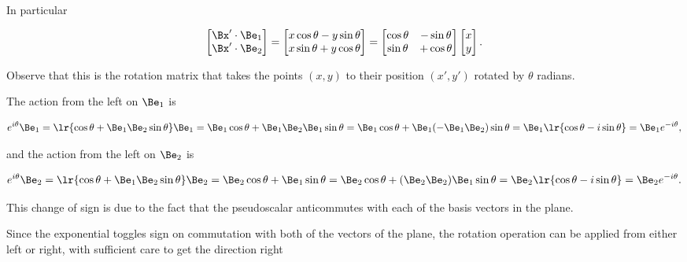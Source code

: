 {In particular

\begin{dmath}\label{eqn:gradeselectionProblems:380}
\begin{bmatrix}
\Bx' \cdot \Be_1 \\
\Bx' \cdot \Be_2 \\
\end{bmatrix}
=
\begin{bmatrix}
x \cos\theta - y \sin\theta \\
x \sin\theta + y \cos\theta 
\end{bmatrix}
=
\begin{bmatrix}
\cos\theta &- \sin\theta \\
\sin\theta &+ \cos\theta 
\end{bmatrix}
\begin{bmatrix}
x \\
y
\end{bmatrix}.
\end{dmath}

Observe that this is the rotation matrix that takes the points \((x, y)\) to their position \((x', y')\) rotated by \( \theta \) radians.

The action from the left on \( \Be_1 \) is

\begin{dmath}\label{eqn:gradeselectionProblems:400}
e^{i\theta} \Be_1
=
\lr{ \cos\theta + \Be_1 \Be_2 \sin\theta} \Be_1
=
\Be_1 \cos\theta + \Be_1 \Be_2 \Be_1 \sin\theta
=
\Be_1 \cos\theta + \Be_1 (-\Be_1 \Be_2) \sin\theta
=
\Be_1 \lr{ \cos\theta - i \sin\theta }
=
\Be_1 e^{-i\theta},
\end{dmath}

and the action from the left on \( \Be_2 \) is

\begin{dmath}\label{eqn:gradeselectionProblems:420}
e^{i\theta} \Be_2
=
\lr{ \cos\theta + \Be_1 \Be_2 \sin\theta} \Be_2
=
\Be_2 \cos\theta + \Be_1 \sin\theta
=
\Be_2 \cos\theta + (\Be_2 \Be_2) \Be_1 \sin\theta
=
\Be_2 \lr{ \cos\theta - i \sin\theta }
=
\Be_2 e^{-i\theta}.
\end{dmath}

This change of sign is due to the fact that the pseudoscalar anticommutes with each of the basis vectors in the plane.


Since the exponential toggles sign on commutation with both of the vectors of the plane, the rotation operation can be applied from either left or right, with sufficient care to get the direction right

}
